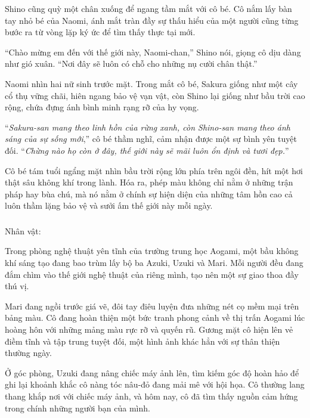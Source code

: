 \documentclass[../main.tex]{subfiles}
\begin{document}
Shino cũng quỳ một chân xuống để ngang tầm mắt với cô bé. Cô nắm lấy bàn tay nhỏ bé của Naomi, ánh mắt tràn đầy sự thấu hiểu của một người cũng từng bước ra từ vòng lặp ký ức để tìm thấy thực tại mới.

``Chào mừng em đến với thế giới này, Naomi-chan,'' Shino nói, giọng cô dịu dàng như gió xuân. ``Nơi đây sẽ luôn có chỗ cho những nụ cười chân thật.''

Naomi nhìn hai nữ sinh trước mặt. Trong mắt cô bé, Sakura giống như một cây cổ thụ vững chãi, hiên ngang bảo vệ vạn vật, còn Shino lại giống như bầu trời cao rộng, chứa đựng ánh bình minh rạng rỡ của hy vọng.

``\textit{Sakura-san mang theo linh hồn của rừng xanh, còn Shino-san mang theo ánh sáng của sự sống mới},'' cô bé thầm nghĩ, cảm nhận được một sự bình yên tuyệt đối. ``\textit{Chừng nào họ còn ở đây, thế giới này sẽ mãi luôn ổn định và tươi đẹp.}''

Cô bé tám tuổi ngẩng mặt nhìn bầu trời rộng lớn phía trên ngôi đền, hít một hơi thật sâu không khí trong lành. Hóa ra, phép màu không chỉ nằm ở những trận pháp hay bùa chú, mà nó nằm ở chính sự hiện diện của những tâm hồn cao cả luôn thầm lặng bảo vệ và sưởi ấm thế giới này mỗi ngày.

\newpage

\subsubsection*{\label{ep-ER11}}
\begin{center}{\caviar Nhân vật:   }\end{center}

Trong phòng nghệ thuật yên tĩnh của trường trung học Aogami, một bầu không khí sáng tạo đang bao trùm lấy bộ ba Azuki, Uzuki và Mari. Mỗi người đều đang đắm chìm vào thế giới nghệ thuật của riêng mình, tạo nên một sự giao thoa đầy thú vị.

Mari đang ngồi trước giá vẽ, đôi tay điêu luyện đưa những nét cọ mềm mại trên bảng màu. Cô đang hoàn thiện một bức tranh phong cảnh về thị trấn Aogami lúc hoàng hôn với những mảng màu rực rỡ và quyến rũ. Gương mặt cô hiện lên vẻ điềm tĩnh và tập trung tuyệt đối, một hình ảnh khác hẳn với sự thân thiện thường ngày.

Ở góc phòng, Uzuki đang nâng chiếc máy ảnh lên, tìm kiếm góc độ hoàn hảo để ghi lại khoảnh khắc cô nàng tóc nâu-đỏ đang mải mê với hội họa. Cô thường lang thang khắp nơi với chiếc máy ảnh, và hôm nay, cô đã tìm thấy nguồn cảm hứng trong chính những người bạn của mình.
\end{document}
